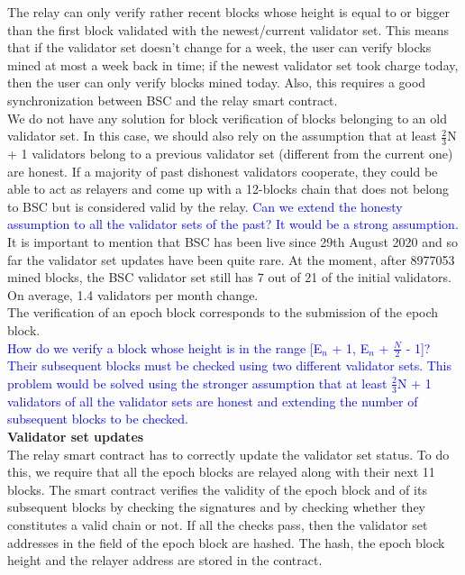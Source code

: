 The relay can only verify rather recent blocks whose height is equal to or bigger than the first block validated with the newest/current validator set. This means that if the validator set doesn't change for a week, the user can verify blocks mined at most a week back in time; if the newest validator set took charge today, then the user can only verify blocks mined today. Also, this requires a good synchronization between BSC and the relay smart contract. \\We do not have any solution for block verification of blocks belonging to an old validator set. In this case, we should also rely on the assumption that at least $\frac{2}{3}$N + 1 validators belong to a previous validator set (different from the current one) are honest. If a majority of past dishonest validators cooperate, they could be able to act as relayers and come up with a 12-blocks chain that does not belong to BSC but is considered valid by the relay. \textcolor{blue}{Can we extend the honesty assumption to all the validator sets of the past? It would be a strong assumption.}\\
It is important to mention that BSC has been live since 29th August 2020 and so far the validator set updates have been quite rare. At the moment, after 8977053 mined blocks, the BSC validator set still has 7 out of 21 of the initial validators. On average, 1.4 validators per month change.\\The verification of an epoch block corresponds to the submission of the epoch block.\\ \textcolor{blue}{How do we verify a block whose height is in the range [E$_{n}$ + 1, E$_n$ + $\frac{N}{2}$ - 1]? Their subsequent blocks must be checked using two different validator sets. This problem would be solved using the stronger assumption that at least $\frac{2}{3}$N + 1 validators of all the validator sets are honest and extending the number of subsequent blocks to be checked.}\\

\noindent
\textbf{Validator set updates}\\
The relay smart contract has to correctly update the validator set status. To do this, we require that all the epoch blocks are relayed along with their next 11 blocks. The smart contract verifies the validity of the epoch block and of its subsequent blocks by checking the signatures and by checking whether they constitutes a valid chain or not. If all the checks pass, then the validator set addresses in the \extradata field of the epoch block are hashed. The hash, the epoch block height and the relayer address are stored in the contract.\\

